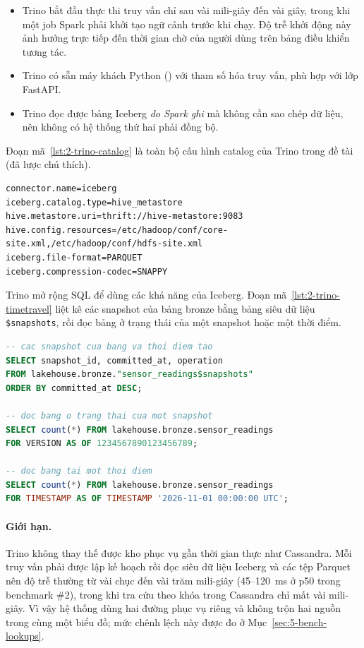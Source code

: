 \begin{itemize}
  \item Trino bắt đầu thực thi truy vấn chỉ sau vài mili-giây đến vài giây, trong khi một job Spark phải khởi tạo ngữ cảnh trước khi chạy. Độ trễ khởi động này ảnh hưởng trực tiếp đến thời gian chờ của người dùng trên bảng điều khiển tương tác.
  \item Trino có sẵn máy khách Python () với tham số hóa truy vấn, phù hợp với lớp FastAPI.
  \item Trino đọc được bảng Iceberg \emph{do Spark ghi} mà không cần sao chép dữ liệu, nên không có hệ thống thứ hai phải đồng bộ.
\end{itemize}

Đoạn mã~\ref{lst:2-trino-catalog} là toàn bộ cấu hình catalog của Trino trong đề tài (đã lược chú thích).

\begin{lstlisting}[caption={Catalog Iceberg của Trino}, label={lst:2-trino-catalog}]
connector.name=iceberg
iceberg.catalog.type=hive_metastore
hive.metastore.uri=thrift://hive-metastore:9083
hive.config.resources=/etc/hadoop/conf/core-site.xml,/etc/hadoop/conf/hdfs-site.xml
iceberg.file-format=PARQUET
iceberg.compression-codec=SNAPPY
\end{lstlisting}

Trino mở rộng SQL để dùng các khả năng của Iceberg. Đoạn mã~\ref{lst:2-trino-timetravel} liệt kê các snapshot của bảng bronze bằng bảng siêu dữ liệu \texttt{\$snapshots}, rồi đọc bảng ở trạng thái của một snapshot hoặc một thời điểm.

\begin{lstlisting}[language=SQL, caption={Truy vấn time travel trong Trino (cú pháp của connector Iceberg)}, label={lst:2-trino-timetravel}]
-- cac snapshot cua bang va thoi diem tao
SELECT snapshot_id, committed_at, operation
FROM lakehouse.bronze."sensor_readings$snapshots"
ORDER BY committed_at DESC;

-- doc bang o trang thai cua mot snapshot
SELECT count(*) FROM lakehouse.bronze.sensor_readings
FOR VERSION AS OF 1234567890123456789;

-- doc bang tai mot thoi diem
SELECT count(*) FROM lakehouse.bronze.sensor_readings
FOR TIMESTAMP AS OF TIMESTAMP '2026-11-01 00:00:00 UTC';
\end{lstlisting}

\paragraph{Giới hạn.} Trino không thay thế được kho phục vụ gần thời gian thực như Cassandra. Mỗi truy vấn phải được lập kế hoạch rồi đọc siêu dữ liệu Iceberg và các tệp Parquet nên độ trễ thường từ vài chục đến vài trăm mili-giây (45--120~ms ở p50 trong benchmark \#2), trong khi tra cứu theo khóa trong Cassandra chỉ mất vài mili-giây. Vì vậy hệ thống dùng hai đường phục vụ riêng và không trộn hai nguồn trong cùng một biểu đồ; mức chênh lệch này được đo ở Mục~\ref{sec:5-bench-lookups}.
